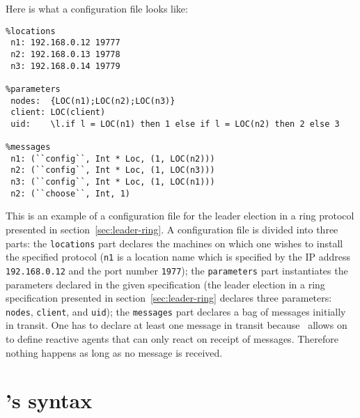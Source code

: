 \documentclass[final]{article}
\begin{document}
Here is what a configuration file looks like:
\begin{emlcode}
\begin{lstlisting}
%locations
 n1: 192.168.0.12 19777
 n2: 192.168.0.13 19778
 n3: 192.168.0.14 19779

%parameters
 nodes:  {LOC(n1);LOC(n2);LOC(n3)}
 client: LOC(client)
 uid:    \l.if l = LOC(n1) then 1 else if l = LOC(n2) then 2 else 3

%messages
 n1: (``config``, Int * Loc, (1, LOC(n2)))
 n2: (``config``, Int * Loc, (1, LOC(n3)))
 n3: (``config``, Int * Loc, (1, LOC(n1)))
 n2: (``choose``, Int, 1)
\end{lstlisting}
\end{emlcode}
This is an example of a configuration file for the leader election in
a ring protocol presented in section~\ref{sec:leader-ring}.  A
configuration file is divided into three parts: the
\lstinline{locations} part declares the machines on which one wishes
to install the specified protocol (\lstinline{n1} is a location name
which is specified by the IP address \lstinline{192.168.0.12} and the
port number \lstinline{1977}); the \lstinline{parameters} part
instantiates the parameters declared in the given specification (the
leader election in a ring specification presented in
section~\ref{sec:leader-ring} declares three parameters:
\lstinline{nodes}, \lstinline{client}, and \lstinline{uid}); the
\lstinline{messages} part declares a bag of messages initially in
transit.  One has to declare at least one message in transit because
\eml\ allows on to define reactive agents that can only react on
receipt of messages.  Therefore nothing happens as long as no message
is received.


\section{\eml's syntax}
\end{document}
